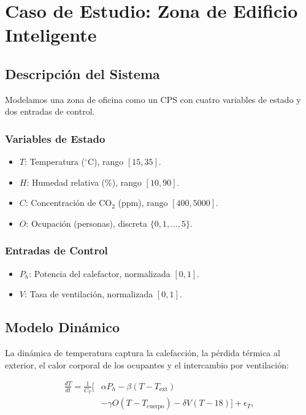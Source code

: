\documentclass[conference]{IEEEtran}
\begin{document}
\section{Caso de Estudio: Zona de Edificio Inteligente}
\label{sec:caso}

\subsection{Descripción del Sistema}
Modelamos una zona de oficina como un CPS con cuatro variables de estado y dos entradas de control.

\subsubsection{Variables de Estado}
\begin{itemize}[nosep]
\item $T$: Temperatura ($^\circ$C), rango $[15, 35]$.
\item $H$: Humedad relativa (\%), rango $[10, 90]$.
\item $C$: Concentración de CO$_2$ (ppm), rango $[400, 5000]$.
\item $O$: Ocupación (personas), discreta $\{0, 1, \dots, 5\}$.
\end{itemize}

\subsubsection{Entradas de Control}
\begin{itemize}[nosep]
\item $P_h$: Potencia del calefactor, normalizada $[0, 1]$.
\item $V$: Tasa de ventilación, normalizada $[0, 1]$.
\end{itemize}

\subsection{Modelo Dinámico}
La dinámica de temperatura captura la calefacción, la pérdida térmica al exterior, el calor corporal de los ocupantes y el intercambio por ventilación:

\begin{align}
\frac{dT}{dt} = \frac{1}{C_T}\Big[&\alpha P_h - \beta(T - T_{\text{ext}}) \nonumber\\
&- \gamma O(T - T_{\text{cuerpo}}) - \delta V(T - 18)\Big] + \epsilon_T,
\label{eq:dT_es}
\end{align}
\end{document}
